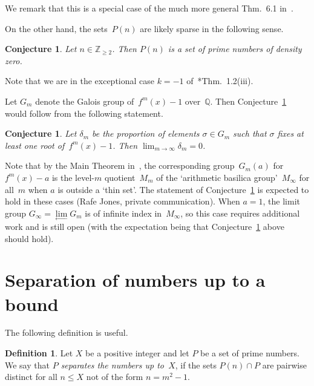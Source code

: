 \documentclass[12pt,a4paper]{amsart}
\newcommand{\Z}{{\mathbb Z}}
\newcommand{\Q}{{\mathbb Q}}
\newtheorem{Conjecture}[Theorem]{Conjecture}
\theoremstyle{definition}
\newtheorem{Definition}[Theorem]{Definition}
\numberwithin{equation}{section}
\begin{document}
We remark that this is a special case of the much more general Thm.~6.1 in~\cite{Jones}.

On the other hand, the sets~$P(n)$ are likely sparse in the following sense.

\begin{Conjecture} \label{Conj1}
  Let $n \in \Z_{\geqslant 2}$. Then $P(n)$ is a set of prime numbers of density zero.
\end{Conjecture}

Note that we are in the exceptional case $k = -1$ of~\cite{Jones}*{Thm.~1.2(iii)}.

Let $G_m$ denote the Galois group of~$f^m(x) - 1$ over~$\Q$. Then Conjecture~\ref{Conj1}
would follow from the following statement.

\begin{Conjecture} \label{Conj2}
  Let $\delta_m$ be the proportion of elements $\sigma \in G_m$ such that $\sigma$
  fixes at least one root of~$f^m(x) - 1$. Then $\lim_{m \to \infty} \delta_m = 0$.
\end{Conjecture}

Note that by the Main Theorem in~\cite{ABCCF}, the corresponding group~$G_m(a)$ for
$f^m(x) - a$ is the level-$m$ quotient~$M_m$ of the `arithmetic basilica group'~$M_\infty$
for all~$m$ when $a$ is outside a `thin set'. The statement of Conjecture~\ref{Conj2}
is expected to hold in these cases (Rafe Jones, private communication). When $a = 1$, the
limit group $G_\infty = \lim\limits_{\longleftarrow} G_m$ is of infinite index in~$M_\infty$,
so this case requires additional work and is still open (with the expectation
being that Conjecture~\ref{Conj2} above should hold).



\section{Separation of numbers up to a bound} \label{S:finite}

The following definition is useful.

\begin{Definition}
  Let $X$ be a positive integer and let $P$ be a set of prime numbers.
  We say that \emph{$P$ separates the numbers up to~$X$}, if the sets $P(n) \cap P$ are pairwise
  distinct for all $n \leqslant X$ not of the form $n = m^2 - 1$.
\end{Definition}
\end{document}
